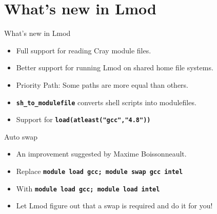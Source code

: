 \documentclass{beamer}
\begin{document}


\section{What's new in Lmod}

\begin{frame}{What's new in Lmod}
  \begin{itemize}
      \item Full support for reading Cray module files.
      \item Better support for running Lmod on shared home file systems.
      \item Priority Path: Some paths are more equal than others.
      \item \texttt{\bf sh\_to\_modulefile} converts shell scripts into modulefiles.
      \item Support for \texttt{\bf load(atleast("gcc","4.8"))}
  \end{itemize}
\end{frame}

\begin{frame}{Auto swap}
  \begin{itemize}
      \item An improvement suggested by Maxime Boissonneault.
      \item Replace \texttt{\bf module load gcc; module swap gcc intel}
      \item With \texttt{\bf module load gcc; module load intel}
      \item Let Lmod figure out that a swap is required and do it for you!
  \end{itemize}
\end{frame}
\end{document}
